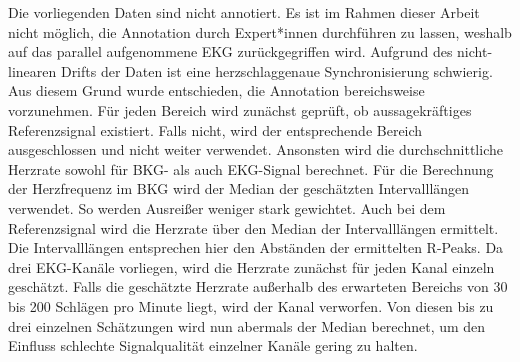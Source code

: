 	Die vorliegenden Daten sind nicht annotiert. Es ist im Rahmen dieser Arbeit nicht möglich, die Annotation durch Expert*innen durchführen zu lassen, weshalb auf das parallel aufgenommene \ac{EKG} zurückgegriffen wird. Aufgrund des nicht-linearen Drifts der Daten ist eine herzschlaggenaue Synchronisierung schwierig. Aus diesem Grund wurde entschieden, die Annotation bereichsweise vorzunehmen. Für jeden Bereich wird zunächst geprüft, ob aussagekräftiges Referenzsignal existiert. Falls nicht, wird der entsprechende Bereich ausgeschlossen und nicht weiter verwendet. Ansonsten wird die durchschnittliche Herzrate sowohl für BKG- als auch EKG-Signal berechnet. Für die Berechnung der Herzfrequenz im \ac{BKG} wird der Median der geschätzten Intervalllängen verwendet. So werden Ausreißer weniger stark gewichtet. Auch bei dem Referenzsignal wird die Herzrate über den Median der Intervalllängen ermittelt. Die Intervalllängen entsprechen hier den Abständen der ermittelten R-Peaks. Da drei \ac{EKG}-Kanäle vorliegen, wird die Herzrate zunächst für jeden Kanal einzeln geschätzt. Falls die geschätzte Herzrate außerhalb des erwarteten Bereichs von 30 bis 200 Schlägen pro Minute liegt, wird der Kanal verworfen. Von diesen bis zu drei einzelnen Schätzungen wird nun abermals der Median berechnet, um den Einfluss schlechte Signalqualität einzelner Kanäle gering zu halten.
	

	
		

